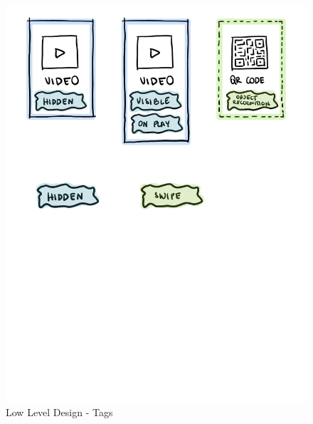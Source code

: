 \begin{figure}[h]
    \centering
    \includegraphics[width=\textwidth]{Figures/Editor/wireframes/tags.png}
    \caption{Low Level Design - Tags}
    \label{fig:tags}
\end{figure}

